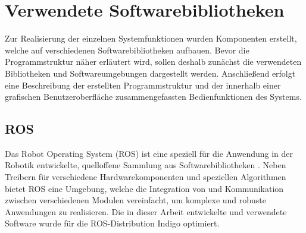 
\prever{
}

\section{Verwendete Softwarebibliotheken}
Zur Realisierung der einzelnen Systemfunktionen wurden Komponenten erstellt, welche auf verschiedenen Softwarebibliotheken aufbauen.
Bevor die Programmstruktur näher erläutert wird, sollen deshalb zunächst die verwendeten Bibliotheken und Softwareumgebungen dargestellt werden.
Anschließend erfolgt eine Beschreibung der erstellten Programmstruktur und der innerhalb einer grafischen Benutzeroberfläche zusammengefassten Bedienfunktionen des Systems.

\subsection{ROS}
\label{chap:ros}
Das Robot Operating System (ROS) ist eine speziell für die Anwendung in der Robotik entwickelte, quelloffene Sammlung aus Softwarebibliotheken \cite{ROS}. Neben Treibern für verschiedene Hardwarekomponenten und speziellen Algorithmen bietet ROS eine Umgebung, welche die Integration von und Kommunikation zwischen verschiedenen Modulen vereinfacht, um komplexe und robuste Anwendungen zu realisieren. Die in dieser Arbeit entwickelte und verwendete Software wurde für die ROS-Distribution Indigo optimiert.


\prever{
}

